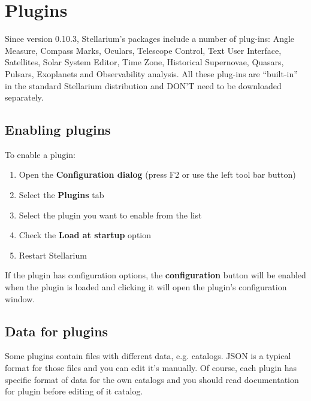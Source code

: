 
\chapter{Plugins}\label{plugins}

Since version 0.10.3, Stellarium's packages include a number of
plug-ins: Angle Measure, Compass Marks, Oculars, Telescope Control, Text
User Interface, Satellites, Solar System Editor, Time Zone, Historical
Supernovae, Quasars, Pulsars, Exoplanets and Observability analysis. All
these plug-ins are ``built-in'' in the standard Stellarium distribution
and DON'T need to be downloaded separately.

\section{Enabling plugins}\label{enabling-plugins}


To enable a plugin:

\begin{enumerate}
\item
  Open the \textbf{Configuration dialog} (press F2 or use the left tool
  bar button)
\item
  Select the \textbf{Plugins} tab
\item
  Select the plugin you want to enable from the list
\item
  Check the \textbf{Load at startup} option
\item
  Restart Stellarium
\end{enumerate}

If the plugin has configuration options, the \textbf{configuration}
button will be enabled when the plugin is loaded and clicking it will
open the plugin's configuration window.

\section{Data for plugins}\label{data-for-plugins}

Some plugins contain files with different data, e.g. catalogs. JSON is a
typical format for those files and you can edit it's manually. Of
course, each plugin has specific format of data for the own catalogs and
you should read documentation for plugin before editing of it catalog.

